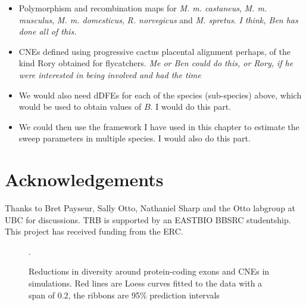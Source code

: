 \documentclass[11pt]{article}
\newcommand{\beginsupplement}{%
        \setcounter{table}{0}
        \renewcommand{\thetable}{S\arabic{table}}%
        \setcounter{figure}{0}
        \renewcommand{\thefigure}{S\arabic{figure}}%
     }
\begin{document}
\begin{itemize}

\item Polymorphism and recombination maps for \textit{M. m. castaneus}, \textit{M. m. musculus}, \textit{M. m. domesticus}, \textit{R. norvegicus} and \textit{M. spretus}. \textit{I think, Ben has done all of this.}

\item CNEs defined using progressive cactus placental alignment perhaps, of the kind Rory obtained for flycatchers. \textit{Me or Ben could do this, or Rory, if he were interested in being involved and had the time}

\item We would also need dDFEs for each of the species (sub-species) above, which would be used to obtain values of $B$. I would do this part.

\item We could then use the framework I have used in this chapter to estimate the sweep parameters in multiple species. I would also do this part.


\end{itemize}



\section*{Acknowledgements}

Thanks to Bret Payseur, Sally Otto, Nathaniel Sharp and the Otto labgroup at UBC for discussions. TRB is supported by an EASTBIO BBSRC studentship. This project has received funding from the ERC.

 
%

\beginsupplement

\newpage












\begin{figure}[h]
   \centering      
   \noindent{}
 \caption{Reductions in diversity around protein-coding exons and CNEs in simulations. Red lines are Loess curves fitted to the data with a span of 0.2, the ribbons are 95\% prediction intervals}.
 
 \label{fig:BGSLoess}
\end{figure}
\end{document}
